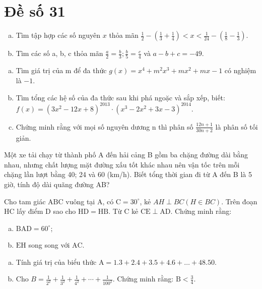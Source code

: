 \onehalfspacing
\section{Đề số 31}

\begin{bt} 
	\hfill
	\begin{enumerate}[a.]
		\item Tìm tập hợp các số nguyên $x$ thỏa mãn $\frac{1}{2}-\left(\frac{1}{3}+\frac{1}{4}\right)<x<\frac{1}{24}-\left(\frac{1}{8}-\frac{1}{3}\right)$.
		\item Tìm các số a, b, c thỏa mãn $\frac{a}{2}=\frac{b}{3} ; \frac{b}{5}=\frac{c}{4}$ và $a-b+c=-49$.
	\end{enumerate}
	\loigiai{} 
\end{bt}

\begin{bt}
	\hfill
	\begin{enumerate}[a.]
		\item Tìm giá trị của $\mathrm{m}$ để đa thức $g(x)=x^4+m^2 x^3+m x^2+m x-1$ có nghiệm là $-1$.
		\item Tìm tổng các hệ số của đa thức sau khi phá ngoặc và sắp xếp, biết: $f(x)=\left(3 x^2-12 x+8\right)^{2013} \cdot\left(x^3-2 x^2+3 x-3\right)^{2014}$.
		\item Chứng minh rằng với mọi số nguyên dương $\mathrm{n}$ thì phân số $\frac{12 n+1}{30 n+2}$ là phân số tối giản.
	\end{enumerate}
	\loigiai{} 
\end{bt}

\begin{bt}
	Một xe tải chạy từ thành phố A đến hải cảng B gồm ba chặng đường dài bằng nhau, 
	nhưng chất lượng mặt đường xấu tốt khác nhau nên vận tốc trên mỗi chặng lần lượt bằng 
	40; 24 và 60 (km/h). Biết tổng thời gian đi từ A đến B là 5 giờ, tính độ dài quãng đường 
	AB?
	\loigiai{} 
\end{bt}

\begin{bt}
	Cho tam giác $\mathrm{ABC}$ vuông tại $\mathrm{A}$, có $\mathrm{C}=30^{\circ}$, kẻ $A H \perp B C(H \in B C)$. Trên đoạn $\mathrm{HC}$ lấy điểm $\mathrm{D}$ sao cho $\mathrm{HD}=\mathrm{HB}$. Từ $\mathrm{C}$ kẻ $\mathrm{CE} \perp \mathrm{AD}$. Chứng minh rằng:
	\begin{enumerate}[a.]
		\item $\mathrm{BAD}=60^{\circ}$;
		\item $\mathrm{EH}$ song song với $\mathrm{AC}$.
	\end{enumerate}
	\loigiai{}
\end{bt}

\begin{bt}
	\hfill
	\begin{enumerate}[a.]
		\item Tính giá trị của biểu thức $\mathrm{A}=1.3+2.4+3.5+4.6+\ldots+48.50$.
		\item Cho $B=\frac{1}{2^2}+\frac{1}{3^2}+\frac{1}{4^2}+\cdots+\frac{1}{100^2}$. Chứng minh rằng: $\mathrm{B}<\frac{3}{4}$.
	\end{enumerate}
	\loigiai{}
\end{bt}
